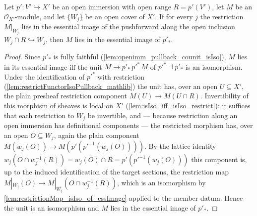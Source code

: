 \begin{lemma}
  \label{lem:essimage_pushforward_cover_local}
  Let \(p' : V' \hookrightarrow X'\) be an open immersion with open range \(R = p'(V')\), let
  \(M\) be an \(\mathcal{O}_{X'}\)-module, and let \(\{W_j\}\) be an open cover of \(X'\).  If
  for every \(j\) the restriction \(M|_{W_j}\) lies in the essential image of the pushforward
  along the open inclusion \(W_j \cap R \hookrightarrow W_j\), then \(M\) lies in the essential
  image of \(p'_*\).
\end{lemma}
\begin{proof}\leanok
  Since \(p'_*\) is fully faithful (\cref{lem:openimm_pullback_counit_isIso}), \(M\) lies in its
  essential image iff the unit \(M \to p'_*\,p'^*\,M\) of \(p'^* \dashv p'_*\) is an isomorphism.
  Under the identification of \(p'^*\) with restriction
  (\cref{lem:restrictFunctorIsoPullback_mathlib}) the unit has, over an open \(U \subseteq X'\),
  the plain presheaf restriction component \(M(U) \to M(U \cap R)\).  Invertibility of this
  morphism of sheaves is local on \(X'\) (\cref{lem:isIso_iff_isIso_restrict}): it suffices that
  each restriction to \(W_j\) be invertible, and — because restriction along an open immersion
  has definitional components — the restricted morphism has, over an open \(O \subseteq W_j\),
  again the plain component \(M(w_j(O)) \to M(p'(p'^{-1}(w_j(O))))\).  By the lattice identity
  \(w_j(O \cap w_j^{-1}(R)) = w_j(O) \cap R = p'(p'^{-1}(w_j(O)))\) this component is, up to the
  induced identification of the target sections, the restriction map
  \(M|_{W_j}(O) \to M|_{W_j}(O \cap w_j^{-1}(R))\), which is an isomorphism by
  \cref{lem:restrictionMap_isIso_of_essImage} applied to the member datum.  Hence the unit is an
  isomorphism and \(M\) lies in the essential image of \(p'_*\).
\end{proof}

